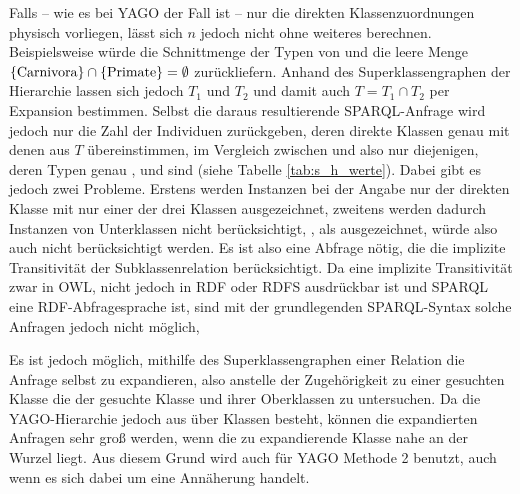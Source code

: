 Falls -- wie es bei YAGO der Fall ist -- nur die direkten Klassenzuordnungen physisch vorliegen, lässt sich $n$ jedoch nicht ohne weiteres berechnen. 
Beispielsweise würde die Schnittmenge der Typen von  und  die leere Menge $\{\textnormal{Carnivora}\} \cap \{\textnormal{Primate}\} = \emptyset$ zurückliefern.
Anhand des Superklassengraphen der Hierarchie lassen sich jedoch $T_1$ und $T_2$ und damit auch $T = T_1 \cap T_2$ per Expansion bestimmen.
Selbst die daraus resultierende SPARQL-Anfrage wird jedoch nur die Zahl der Individuen zurückgeben, deren direkte Klassen genau mit denen aus
$T$ übereinstimmen, im Vergleich zwischen  und  also nur diejenigen, deren Typen genau ,  und  sind (siehe Tabelle \ref{tab:s_h_werte}).
Dabei gibt es jedoch zwei Probleme. Erstens werden Instanzen bei der Angabe nur der direkten Klasse mit nur einer der drei Klassen ausgezeichnet, zweitens werden dadurch Instanzen von Unterklassen nicht berücksichtigt,
, als  ausgezeichnet, würde also auch nicht berücksichtigt werden. Es ist also eine Abfrage nötig, die die implizite Transitivität der Subklassenrelation berücksichtigt.
Da eine implizite Transitivität zwar in OWL, nicht jedoch in RDF oder RDFS ausdrückbar ist und SPARQL eine RDF-Abfragesprache ist, sind mit der grundlegenden SPARQL-Syntax solche Anfragen jedoch nicht möglich,

Es ist jedoch möglich, mithilfe des Superklassengraphen einer Relation die Anfrage selbst zu expandieren, also anstelle der Zugehörigkeit zu einer gesuchten Klasse die der gesuchte Klasse und ihrer Oberklassen zu untersuchen.
Da die YAGO-Hierarchie jedoch aus über  Klassen besteht, können die expandierten Anfragen sehr groß werden, wenn die zu expandierende Klasse nahe an der Wurzel liegt. Aus diesem Grund wird auch für YAGO
Methode 2 benutzt, auch wenn es sich dabei um eine Annäherung handelt.

